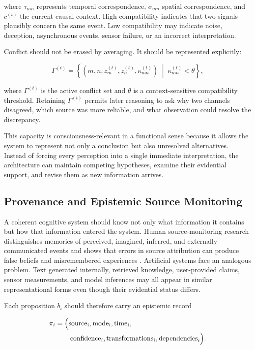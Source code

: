 where $\tau_{mn}$ represents temporal correspondence, $\sigma_{mn}$ spatial correspondence, and $c^{(t)}$ the current causal context. High compatibility indicates that two signals plausibly concern the same event. Low compatibility may indicate noise, deception, asynchronous events, sensor failure, or an incorrect interpretation.

Conflict should not be erased by averaging. It should be represented explicitly:

\begin{equation}
\Gamma^{(t)}
=
\left\{
(m,n,z_m^{(t)},z_n^{(t)},\kappa_{mn}^{(t)})
\;\middle|\;
\kappa_{mn}^{(t)} < \theta
\right\},
\label{eq:conflict-set}
\end{equation}

where $\Gamma^{(t)}$ is the active conflict set and $\theta$ is a context-sensitive compatibility threshold. Retaining $\Gamma^{(t)}$ permits later reasoning to ask why two channels disagreed, which source was more reliable, and what observation could resolve the discrepancy.

This capacity is consciousness-relevant in a functional sense because it allows the system to represent not only a conclusion but also unresolved alternatives. Instead of forcing every perception into a single immediate interpretation, the architecture can maintain competing hypotheses, examine their evidential support, and revise them as new information arrives.

\subsection{Provenance and Epistemic Source Monitoring}
\label{subsec:provenance-source-monitoring}

A coherent cognitive system should know not only what information it contains but how that information entered the system. Human source-monitoring research distinguishes memories of perceived, imagined, inferred, and externally communicated events and shows that errors in source attribution can produce false beliefs and misremembered experiences \cite{johnson1993source}. Artificial systems face an analogous problem. Text generated internally, retrieved knowledge, user-provided claims, sensor measurements, and model inferences may all appear in similar representational forms even though their evidential status differs.

Each proposition $b_i$ should therefore carry an epistemic record

\begin{equation}
\begin{aligned}
\pi_i
&=
\Bigl(
\operatorname{source}_i,
\operatorname{mode}_i,
\operatorname{time}_i, \\
&\qquad
\operatorname{confidence}_i,
\operatorname{transformations}_i,
\operatorname{dependencies}_i
\Bigr).
\end{aligned}
\label{eq:epistemic-provenance}
\end{equation}

